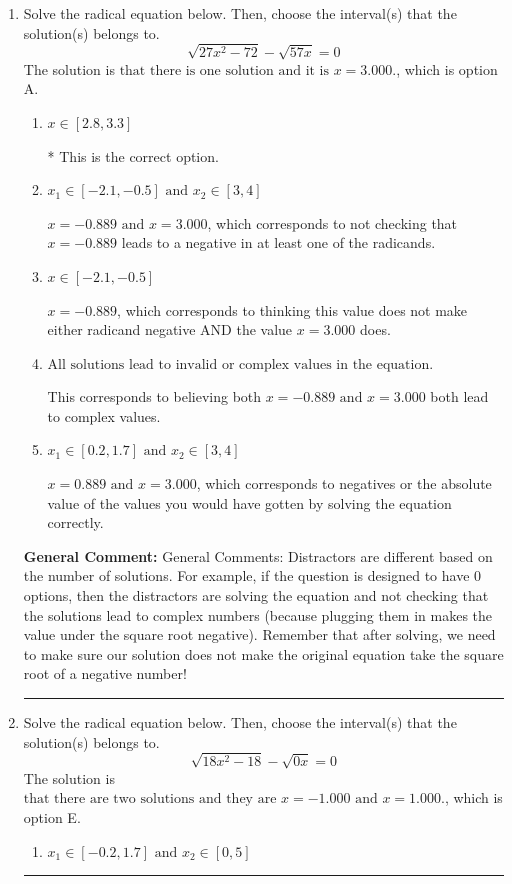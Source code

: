\documentclass{extbook}[14pt]
\newcommand{\litem}[1]{\item #1

\rule{\textwidth}{0.4pt}}
\begin{document}
\begin{enumerate}\litem{
Solve the radical equation below. Then, choose the interval(s) that the solution(s) belongs to.
\[ \sqrt{27 x^2 - 72} - \sqrt{57 x} = 0 \]The solution is \( \text{that there is one solution and it is } x = 3.000. \), which is option A.\begin{enumerate}[label=\Alph*.]
\item \( x \in [2.8,3.3] \)

* This is the correct option.
\item \( x_1 \in [-2.1, -0.5] \text{ and } x_2 \in [3,4] \)

$x = -0.889 \text{ and } x = 3.000$, which corresponds to not checking that $x = -0.889$ leads to a negative in at least one of the radicands.
\item \( x \in [-2.1,-0.5] \)

$x = -0.889$, which corresponds to thinking this value does not make either radicand negative AND the value $x = 3.000$ does.
\item \( \text{All solutions lead to invalid or complex values in the equation.} \)

This corresponds to believing both $x = -0.889 \text{ and } x = 3.000$ both lead to complex values.
\item \( x_1 \in [0.2, 1.7] \text{ and } x_2 \in [3,4] \)

$x = 0.889 \text{ and } x = 3.000$, which corresponds to negatives or the absolute value of the values you would have gotten by solving the equation correctly.
\end{enumerate}

\textbf{General Comment:} General Comments: Distractors are different based on the number of solutions. For example, if the question is designed to have 0 options, then the distractors are solving the equation and not checking that the solutions lead to complex numbers (because plugging them in makes the value under the square root negative). Remember that after solving, we need to make sure our solution does not make the original equation take the square root of a negative number!
}
\litem{
Solve the radical equation below. Then, choose the interval(s) that the solution(s) belongs to.
\[ \sqrt{18 x^2 - 18} - \sqrt{0 x} = 0 \]The solution is \( \text{that there are two solutions and they are } x = -1.000 \text{ and } x = 1.000. \), which is option E.\begin{enumerate}[label=\Alph*.]
\item \( x_1 \in [-0.2, 1.7] \text{ and } x_2 \in [0,5] \)


\end{enumerate}}
\end{enumerate}
\end{document}
